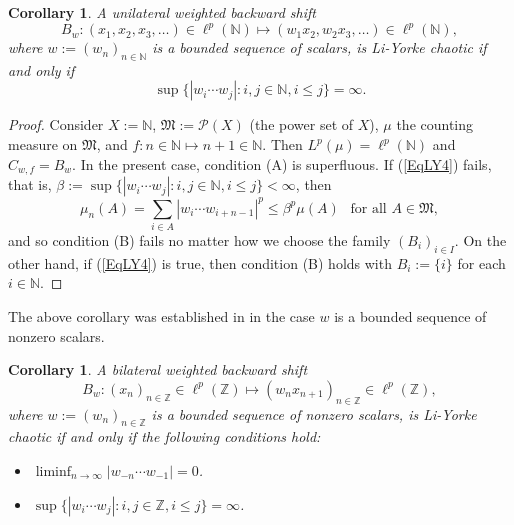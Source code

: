 \documentclass[12pt]{amsart}
\theoremstyle{theorem}
\newtheorem{corollary}[theorem]{Corollary}
\theoremstyle{definition}
\theoremstyle{remark} \theoremstyle{question} \theoremstyle{example}
\newcommand{\N}{\mathbb{N}}
\newcommand{\Z}{\mathbb{Z}}
\newcommand{\cP}{\mathcal{P}}
\newcommand{\fM}{\mathfrak{M}}
\begin{document}
\begin{corollary}\label{CorLY2}
A unilateral weighted backward shift
\[
B_w : (x_1,x_2,x_3,\ldots) \in \ell^p(\N) \mapsto (w_1x_2,w_2x_3,\ldots) \in \ell^p(\N),
\]
where $w\!:= (w_n)_{n \in \N}$ is a bounded sequence of scalars, is Li-Yorke chaotic if and only if
\begin{equation}\label{EqLY4}
\sup\{|w_i \cdots w_j| : i,j \in \N, i \leq j\} = \infty.
\end{equation}
\end{corollary}

\begin{proof}
Consider $X\!:= \N$, $\fM\!:= \cP(X)$ (the power set of $X$), $\mu$ the counting measure on $\fM$, and $f : n \in \N \mapsto n+1 \in \N$.
Then $L^p(\mu) = \ell^p(\N)$ and $C_{w,f} = B_w$. In the present case, condition (A) is superfluous.
If (\ref{EqLY4}) fails, that is, $\beta\!:= \sup\{|w_i \cdots w_j| : i,j \in \N, i \leq j\} < \infty$, then
\[
\mu_n(A) = \sum_{i \in A} |w_i \cdots w_{i+n-1}|^p \leq \beta^p \mu(A) \ \ \text{ for all } A \in \fM,
\]
and so condition (B) fails no matter how we choose the family $(B_i)_{i \in I}$.
On the other hand, if (\ref{EqLY4}) is true, then condition (B) holds with $B_i\!:= \{i\}$ for each $i \in \N$.
\end{proof}

The above corollary was established in \cite[Proposition~27]{BerBonMarPer11} in the case $w$ is a bounded sequence of nonzero scalars.

\begin{corollary}\label{CorLY3}
A bilateral weighted backward shift
\[
B_w : (x_n)_{n \in \Z} \in \ell^p(\Z) \mapsto (w_n x_{n+1})_{n \in \Z} \in \ell^p(\Z),
\]
where $w\!:= (w_n)_{n \in \Z}$ is a bounded sequence of nonzero scalars, is Li-Yorke chaotic if and only if the following conditions hold:
\begin{itemize}
\item [\rm (a)] $\displaystyle \liminf_{n \to \infty} |w_{-n} \cdots w_{-1}| = 0$.
\item [\rm (b)] $\sup\{|w_i \cdots w_j| : i,j \in \Z, i \leq j\} = \infty$.
\end{itemize}
\end{corollary}
\end{document}
